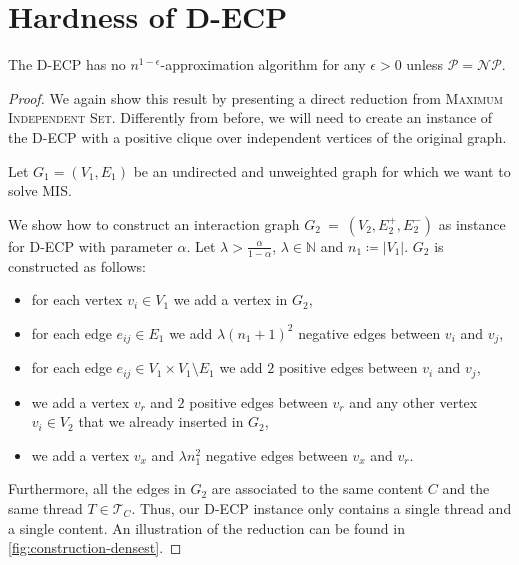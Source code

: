\section{Hardness of \acrshort{D-ECP}}%
\label{sub:d-ecp-hardness}

\begin{theorem}
	\label{th:approximability-densest}
	The \acrfull{D-ECP} has no $n^{1-\epsilon} $-approximation algorithm for
	any $\epsilon > 0$ unless $\mathcal{P} = \mathcal{NP}  $.
\end{theorem}

\begin{proof}
	We again show this result by presenting a direct reduction from \textsc{Maximum
		Independent Set}. Differently from before, we will need to create an
	instance of the \acrshort{D-ECP} with a positive clique over
	independent vertices of the original graph.

	\bigskip
	Let $G_{1}  = (V_{1} ,E_{1} )$ be an undirected and unweighted graph for
	which we want to solve MIS.

	We show how to construct an interaction graph \mbox{${G}_{2}~=~(V_{2} , E^{+}_{2} , E
				^{-}_{2} ) $} as instance for \acrshort{D-ECP} with parameter
	$\alpha $. Let $\lambda > \frac{\alpha }{1 - \alpha }$, $\lambda \in \mathbb{N} $ and $n_{1} \coloneqq |V_{1}| $.
	$G_2$ is constructed as follows:

	\begin{itemize}
		\item for each vertex $v_{i}  \in V_{1} $ we add a vertex in $G_{2} $,
		\item for each edge $e_{ij}  \in
			      E_{1} $ we add $\lambda (n_{1}+1)^{2}  $ negative edges
		      between $v_{i} $ and $v_{j} $,
		\item for each edge $e_{ij} \in V_1 \times V_1 \setminus
			      E_{1} $ we add $2$ positive edges between $v_{i} $ and $v_{j}
		      $,
		\item we add a vertex $v_r$ and $2$ positive edges between $v_r$ and any other
		      vertex $v_i \in V_2$ that we already inserted in $G_2$,
		\item we add a vertex $v_x$ and $\lambda n_{1}^{2}  $ negative edges between $v_x$
		      and $v_{r} $.
	\end{itemize}

	Furthermore, all the edges in $G_{2} $ are associated to the same content
	$C$ and the same thread $T \in \mathcal{T}_{C}  $. Thus, our \acrshort{D-ECP} instance only contains a single thread and a
	single content.
	An illustration of the reduction can be found in
	\autoref{fig:construction-densest}.


\end{proof}
